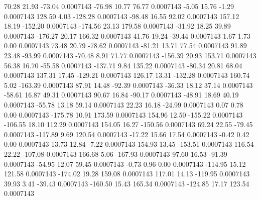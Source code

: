        70.28       21.93      -73.04     0.0007143
      -76.98       10.77       76.77     0.0007143
       -5.05       15.76       -1.29     0.0007143
      128.50        4.03     -128.28     0.0007143
      -98.48       16.55       92.02     0.0007143
      157.12       18.19     -152.20     0.0007143
     -174.56       23.13      179.58     0.0007143
      -31.92       18.25       39.89     0.0007143
     -176.27       20.17      166.32     0.0007143
       41.76       19.24      -39.44     0.0007143
        1.67        1.73        0.00     0.0007143
       73.48       20.79      -78.62     0.0007143
      -81.21       13.71       77.54     0.0007143
       91.89       23.48      -93.99     0.0007143
      -70.48        8.91       71.77     0.0007143
     -156.39       20.93      153.71     0.0007143
       56.38       16.70      -55.58     0.0007143
     -137.71        9.84      135.22     0.0007143
      -80.34       20.81       68.04     0.0007143
      137.31       17.45     -129.21     0.0007143
      126.17       13.31     -132.28     0.0007143
      160.74        5.02     -163.39     0.0007143
       87.91       14.48      -92.39     0.0007143
      -36.33       18.12       37.14     0.0007143
      -58.61       16.87       49.31     0.0007143
       90.67       16.84      -90.17     0.0007143
      -48.91       18.69       40.19     0.0007143
      -55.78       13.18       59.14     0.0007143
       22.23       16.18      -24.99     0.0007143
        0.07        0.78        0.00     0.0007143
     -175.78       10.91      173.59     0.0007143
      154.96       12.50     -155.22     0.0007143
     -106.55       18.10      112.29     0.0007143
      154.05       16.27     -150.56     0.0007143
       69.24       22.55      -79.45     0.0007143
     -117.89        9.69      120.54     0.0007143
      -17.22       15.66       17.54     0.0007143
       -0.42        0.42        0.00     0.0007143
       13.73       12.84       -7.22     0.0007143
      154.93       13.45     -153.51     0.0007143
      116.54       22.22     -107.08     0.0007143
      166.68        5.06     -167.93     0.0007143
       97.60       16.53      -91.39     0.0007143
      -54.95       12.07       59.45     0.0007143
       -0.73        0.96        0.00     0.0007143
     -114.95       15.12      121.58     0.0007143
     -174.02       19.28      159.08     0.0007143
      117.01       14.13     -119.95     0.0007143
       39.93        3.41      -39.43     0.0007143
     -160.50       15.43      165.34     0.0007143
     -124.85       17.17      123.54     0.0007143
